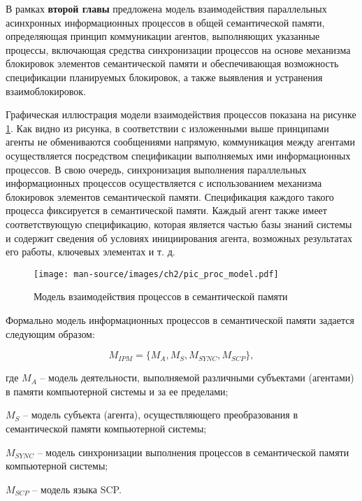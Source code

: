 \documentclass{thesisby}
\begin{document}
В рамках \textbf{второй главы} предложена модель взаимодействия параллельных асинхронных информационных процессов в общей семантической памяти, определяющая принцип коммуникации агентов, выполняющих указанные процессы, включающая средства синхронизации процессов на основе механизма блокировок элементов семантической памяти и обеспечивающая возможность спецификации планируемых блокировок, а также выявления и устранения взаимоблокировок.

Графическая иллюстрация модели взаимодействия процессов показана на рисунке \ref{fig:pic_proc_model}. Как видно из рисунка, в соответствии с изложенными выше принципами агенты не обмениваются сообщениями напрямую, коммуникация между агентами осуществляется посредством спецификации выполняемых ими информационных процессов. В свою очередь, синхронизация выполнения параллельных информационных процессов осуществляется с использованием механизма блокировок элементов семантической памяти. Спецификация каждого такого процесса фиксируется в семантической памяти. Каждый агент также имеет соответствующую спецификацию, которая является частью базы знаний системы и содержит сведения об условиях инициирования агента, возможных результатах его работы, ключевых элементах и т. д.

\begin{figure}[H]
  \centering
  \texttt{[image: man-source/images/ch2/pic\_proc\_model.pdf]}
  \caption{Модель взаимодействия процессов в семантической памяти}
  \label{fig:pic_proc_model}
\end{figure}

Формально модель информационных процессов в семантической памяти задается следующим образом:

\begin{equation} 
\label{<eq2_1>} 
M_{IPM} = \{M_A, M_S, M_{SYNC}, M_{SCP}\},
\end{equation} 

\noindent \hangindent=21mm 
где $M_A$ – модель деятельности, выполняемой различными субъектами (агентами) в памяти компьютерной системы и за ее пределами;

\parindent=9mm \hangindent=23mm 
$M_S$ – модель субъекта (агента), осуществляющего преобразования в семантической памяти компьютерной системы;

\parindent=9mm \hangindent=31mm 
$M_{SYNC}$ – модель синхронизации выполнения процессов в семантической памяти компьютерной системы;

\parindent=9mm
$M_{SCP}$ – модель языка SCP.
\end{document}
